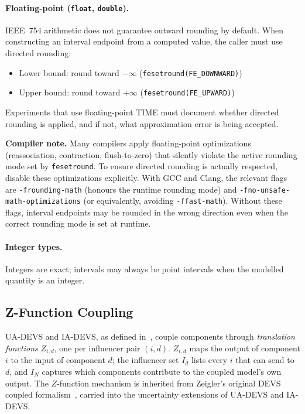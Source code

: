 \paragraph{Floating-point (\texttt{float}, \texttt{double}).}
IEEE~754 arithmetic does not guarantee outward rounding by default.  When
constructing an interval endpoint from a computed value, the caller must
use directed rounding:
\begin{itemize}
  \item Lower bound: round toward $-\infty$ (\texttt{fesetround(FE\_DOWNWARD)})
  \item Upper bound: round toward $+\infty$ (\texttt{fesetround(FE\_UPWARD)})
\end{itemize}
Experiments that use floating-point TIME must document whether directed
rounding is applied, and if not, what approximation error is being accepted.

\textbf{Compiler note.}  Many compilers apply floating-point optimizations
(reassociation, contraction, flush-to-zero) that silently violate the active
rounding mode set by \texttt{fesetround}.  To ensure directed rounding is
actually respected, disable these optimizations explicitly.  With GCC and
Clang, the relevant flags are \texttt{-frounding-math} (honours the runtime
rounding mode) and \texttt{-fno-unsafe-math-optimizations} (or equivalently,
avoiding \texttt{-ffast-math}).  Without these flags, interval endpoints may be
rounded in the wrong direction even when the correct rounding mode is set at
runtime.

\paragraph{Integer types.}
Integers are exact; intervals may always be point intervals when the modelled
quantity is an integer.

\subsection*{Z-Function Coupling}

UA-DEVS and IA-DEVS, as defined in~\cite{VDW21}, couple components through
\emph{translation functions} $Z_{i,d}$, one per influencer pair $(i, d)$.
$Z_{i,d}$ maps the output of component $i$ to the input of component $d$;
the influencer set $I_d$ lists every $i$ that can send to $d$, and $I_N$
captures which components contribute to the coupled model's own output.
The $Z$-function mechanism is inherited from Zeigler's original DEVS coupled
formalism~\cite{Zeigler00}, carried into the uncertainty extensions of
UA-DEVS and IA-DEVS.

